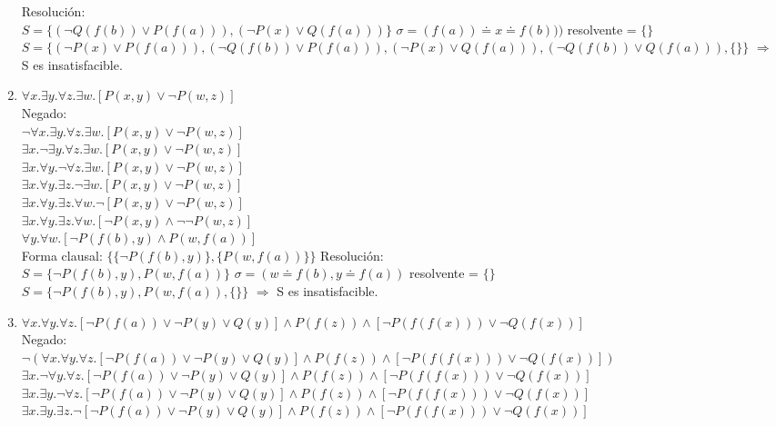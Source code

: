 \documentclass[10pt,a4paper]{article}
\begin{document}
\begin{enumerate}
Resolución: \\
$S=\{(\neg Q(f(b)) \vee P(f(a))), (\neg P(x)\vee Q(f(a)))\}$ $\sigma=(f(a)) \doteq x \doteq f(b)))$ resolvente = $ \{\} $ \\
$S=\{ (\neg P(x) \vee P(f(a))), (\neg Q(f(b)) \vee P(f(a))), (\neg P(x)\vee Q(f(a))), (\neg Q(f(b)) \vee Q(f(a))), \{\}\}$ $\Rightarrow$ S es insatisfacible.
\item
$\forall x. \exists y. \forall z. \exists w. [P(x,y) \vee \neg P(w,z)]$ \\
Negado: \\
$\neg \forall x. \exists y. \forall z. \exists w. [P(x,y) \vee \neg P(w,z)]$ \\
$\exists x. \neg \exists y. \forall z. \exists w. [P(x,y) \vee \neg P(w,z)]$ \\
$\exists x. \forall y. \neg \forall z. \exists w. [P(x,y) \vee \neg P(w,z)]$ \\
$\exists x. \forall y. \exists z. \neg \exists w. [P(x,y) \vee \neg P(w,z)]$ \\
$\exists x. \forall y. \exists z. \forall w. \neg [P(x,y) \vee \neg P(w,z)]$ \\
$\exists x. \forall y. \exists z. \forall w. [\neg P(x,y) \wedge \neg \neg P(w,z)]$ \\
$\forall y. \forall w. [\neg P(f(b),y) \wedge P(w,f(a))]$ \\
Forma clausal: $\{\{ \neg P(f(b),y) \}, \{P(w,f(a)) \} \}$
Resolución: \\
$S=\{ \neg P(f(b),y), P(w,f(a)) \}$ $\sigma=(w \doteq f(b), y \doteq f(a))$ resolvente = $ \{\} $ \\
$S=\{ \neg P(f(b),y), P(w,f(a)), \{\} \}$ $\Rightarrow$ S es insatisfacible.
\item
$\forall x. \forall y. \forall z. [\neg P(f(a)) \vee \neg P(y) \vee Q(y)] \wedge P(f(z)) \wedge [\neg P(f(f(x))) \vee \neg Q(f(x))]$ \\
Negado: \\
$\neg (\forall x. \forall y. \forall z. [\neg P(f(a)) \vee \neg P(y) \vee Q(y)] \wedge P(f(z)) \wedge [\neg P(f(f(x))) \vee \neg Q(f(x))])$ \\
$\exists x. \neg \forall y. \forall z. [\neg P(f(a)) \vee \neg P(y) \vee Q(y)] \wedge P(f(z)) \wedge [\neg P(f(f(x))) \vee \neg Q(f(x))]$ \\
$\exists x. \exists y. \neg \forall z. [\neg P(f(a)) \vee \neg P(y) \vee Q(y)] \wedge P(f(z)) \wedge [\neg P(f(f(x))) \vee \neg Q(f(x))]$ \\
$\exists x. \exists y. \exists z. \neg [\neg P(f(a)) \vee \neg P(y) \vee Q(y)] \wedge P(f(z)) \wedge [\neg P(f(f(x))) \vee \neg Q(f(x))]$ \\

\end{enumerate}
\end{document}

